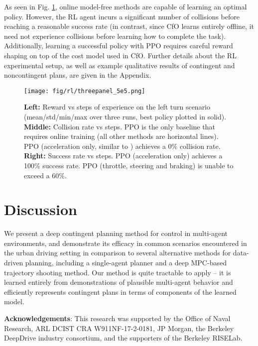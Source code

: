 \documentclass[conference]{IEEEtran}
\newcommand{\mypara}[1]{\vspace{1mm}\noindent\textbf{#1}:}
\newcommand{\ours}[0]{{CfO}}
\begin{document}
As seen in Fig. \ref{fig:modelfreecombined}, online model-free methods are capable of learning an optimal policy. 
However, the RL agent incurs a significant number of collisions before reaching a reasonable success rate
(in contrast, since \ours{} learns entirely offline, it need not experience collisions before learning how to complete the task).
Additionally, learning a successful policy with PPO requires careful reward shaping on top of the cost model used in \ours{}. Further details about the RL experimental setup, as well as example qualitative results of contingent and noncontingent plans, are given in the Appendix.

\begin{figure}[t]
    \centering
    \texttt{[image: fig/rl/threepanel\_5e5.png]}
    \vspace{-.1em}
    \caption{\small
    \textbf{Left:} Reward vs steps of experience on the left turn scenario (mean/std/min/max over three runs, best policy plotted in solid). 
    \textbf{Middle:} Collision rate vs steps. PPO is the only baseline that requires online training (all other methods are horizontal lines). PPO (acceleration only, similar to \cite{tang2019mfp}) achieves a 0\% collision rate. 
    \textbf{Right:} Success rate vs steps. PPO (acceleration only) achieves a 100\% success rate. PPO (throttle, steering and braking) is unable to exceed a 60\%.
    }
    \label{fig:modelfreecombined}
    \vspace{-1.75em}
\end{figure}
\vspace{-.4em}
\section{Discussion}
\vspace{-.35em}
We present a deep contingent planning method for control in multi-agent environments, and demonstrate its efficacy in common scenarios encountered in the urban driving setting in comparison to several alternative methods for data-driven planning, including a single-agent planner and a deep MPC-based trajectory shooting method. Our method is quite tractable to apply -- it is learned entirely from demonstrations of plausible multi-agent behavior and efficiently represents contingent plans in terms of components of the learned model.
 
\mypara{Acknowledgements}
This research was supported by the Office of Naval Research, ARL DCIST CRA W911NF-17-2-0181, JP Morgan, the Berkeley DeepDrive industry consortium, and the supporters of the Berkeley RISELab.

 
{ \footnotesize


}


\end{document}
